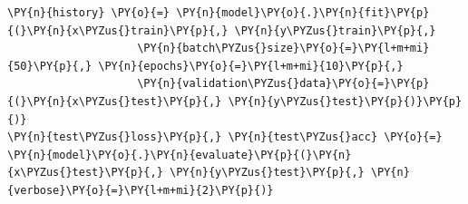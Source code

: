 \documentclass[a4paper,11pt]{article}%
\begin{document}
\begin{tcolorbox}[breakable, size=fbox, boxrule=1pt, pad at break*=1mm,colback=cellbackground, colframe=cellborder]
\begin{Verbatim}[commandchars=\\\{\}]
\PY{n}{history} \PY{o}{=} \PY{n}{model}\PY{o}{.}\PY{n}{fit}\PY{p}{(}\PY{n}{x\PYZus{}train}\PY{p}{,} \PY{n}{y\PYZus{}train}\PY{p}{,}
                    \PY{n}{batch\PYZus{}size}\PY{o}{=}\PY{l+m+mi}{50}\PY{p}{,} \PY{n}{epochs}\PY{o}{=}\PY{l+m+mi}{10}\PY{p}{,} 
                    \PY{n}{validation\PYZus{}data}\PY{o}{=}\PY{p}{(}\PY{n}{x\PYZus{}test}\PY{p}{,} \PY{n}{y\PYZus{}test}\PY{p}{)}\PY{p}{)}
\PY{n}{test\PYZus{}loss}\PY{p}{,} \PY{n}{test\PYZus{}acc} \PY{o}{=} \PY{n}{model}\PY{o}{.}\PY{n}{evaluate}\PY{p}{(}\PY{n}{x\PYZus{}test}\PY{p}{,} \PY{n}{y\PYZus{}test}\PY{p}{,} \PY{n}{verbose}\PY{o}{=}\PY{l+m+mi}{2}\PY{p}{)}
\end{Verbatim}
\end{tcolorbox}
  
\end{document}
